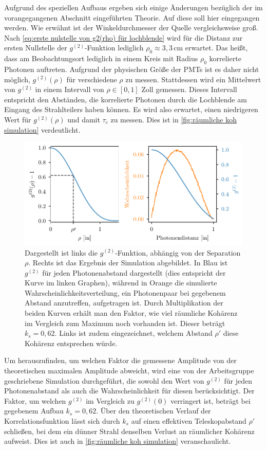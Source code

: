 Aufgrund des speziellen Aufbaus ergeben sich einige Änderungen bezüglich der im vorangegangenen Abschnitt eingeführten Theorie. 
Auf diese soll hier eingegangen werden. 
Wie erwähnt ist der Winkeldurchmesser der Quelle vergleichsweise groß. 
Nach \autoref{eq:erste nulstelle von g2(rho) für lochblende} wird für die Distanz zur ersten Nullstelle der $g^{(2)}$-Funktion lediglich $\rho_0\approx3,3\,\mathrm{cm}$ erwartet. 
Das heißt, dass am Beobachtungsort lediglich in einem Kreis mit Radius $\rho_0$ korrelierte Photonen auftreten. 
Aufgrund der physischen Größe der PMTs ist es daher nicht möglich, $g^{(2)}(\rho)$ für verschiedene $\rho$ zu messen. 
Stattdessen wird ein Mittelwert von $g^{(2)}$ in einem Intervall von $\rho\in[0,1]$ Zoll gemessen. 
Dieses Intervall entspricht den Abständen, die korrelierte Photonen durch die Lochblende am Eingang des Strahlteilers haben können. 
Es wird also erwartet, einen niedrigeren Wert für $g^{(2)}(\rho)$ und damit $\tau_c$ zu messen. 
Dies ist in \autoref{fig:räumliche koh simulation} verdeutlicht. 
\begin{figure}[h]
    \centering
    \includegraphics{images/Aufbau/g2(rho).pdf}
    \caption{Dargestellt ist links die $g^{(2)}$-Funktion, abhängig von der Separation $\rho$. Rechts ist das Ergebnis der Simulation abgebildet. In Blau ist $g^{(2)}$ für jeden Photonenabstand dargestellt (dies entspricht der Kurve im linken Graphen), während in Orange die simulierte Wahrscheinlichkeitsverteilung, ein Photonenpaar bei gegebenem Abstand anzutreffen, aufgetragen ist. Durch Multiplikation der beiden Kurven erhält man den Faktor, wie viel räumliche Kohärenz im Vergleich zum Maximum noch vorhanden ist. Dieser beträgt $k_s=0,62$. Links ist zudem eingezeichnet, welchem Abstand $\rho\prime$ diese Kohärenz entsprechen würde. }
    \label{fig:räumliche koh simulation}
\end{figure}
Um herauszufinden, um welchen Faktor die gemessene Amplitude von der theoretischen maximalen Amplitude abweicht, wird eine von der Arbeitsgruppe geschriebene Simulation durchgeführt, die sowohl den Wert von $g^{(2)}$ für jeden Photonenabstand als auch die Wahrscheinlichkeit für diesen berücksichtigt. 
Der Faktor, um welchen $g^{(2)}$ im Vergleich zu $g^{(2)}(0)$ verringert ist, beträgt bei gegebenem Aufbau $k_s=0,62$. 
Über den theoretischen Verlauf der Korrelationsfunktion lässt sich durch $k_s$ auf einen effektiven Teleskopabstand $\rho\prime$ schließen, bei dem ein dünner Strahl denselben Verlust an räumlicher Kohärenz aufweist. 
Dies ist auch in \autoref{fig:räumliche koh simulation} veranschaulicht. \\

